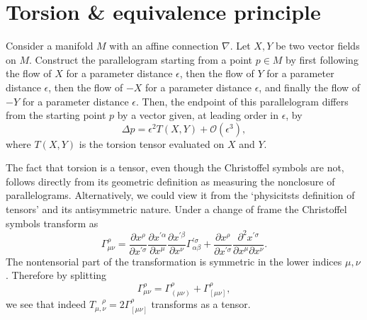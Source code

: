 \section{Torsion \& equivalence principle}
\label{sec:torsion_and_equivalence_principle}


\begin{mytheorem}
Consider a manifold \(M\) with an affine connection \(\nabla\).
Let \(X,Y\) be two vector fields on \(M\).
Construct the parallelogram starting from a point \(p \in M\) by first following the flow of \(X\) for a parameter distance \(\epsilon\), then the flow of \(Y\) for a parameter distance \(\epsilon\), then the flow of \(-X\) for a parameter distance \(\epsilon\), and finally the flow of \(-Y\) for a parameter distance \(\epsilon\).
Then, the endpoint of this parallelogram differs from the starting point \(p\) by a vector given, at leading order in \(\epsilon\), by
\begin{equation}
    \Delta p = \epsilon^2 T(X,Y) + \mathcal{O}(\epsilon^3),
\end{equation}
where \(T(X,Y)\) is the torsion tensor evaluated on \(X\) and \(Y\).
\end{mytheorem}


\begin{mytheorem}
The fact that torsion is a tensor, even though the Christoffel symbols are not, follows directly from its geometric definition as measuring the nonclosure of parallelograms.
Alternatively, we could view it from the `physicitsts definition of tensors' and its antisymmetric nature.
Under a change of frame the Christoffel symbols transform as
\begin{equation}
    \Gamma^{\rho}_{\mu \nu} = \frac{\partial x^{\rho}}{\partial x^{\prime \sigma}} \frac{\partial x^{\prime \alpha}}{\partial x^{\mu}} \frac{\partial x^{\prime \beta}}{\partial x^{\nu}} \Gamma^{\prime \sigma}_{\alpha \beta} + \frac{\partial x^{\rho}}{\partial x^{\prime \sigma}} \frac{\partial^2 x^{\prime \sigma}}{\partial x^{\mu} \partial x^{\nu}}.
\end{equation}
The nontensorial part of the transformation is symmetric in the lower indices \(\mu, \nu\).
Therefore by splitting
\begin{equation}
    \Gamma^{\rho}_{\mu \nu} = \Gamma^{\rho}_{(\mu \nu)} + \Gamma^{\rho}_{[\mu \nu]},
\end{equation}
we see that indeed $T_{\mu,\nu}^{\quad \rho} = 2 \Gamma^{\rho}_{[\mu \nu]}$ transforms as a tensor.
\end{mytheorem}


